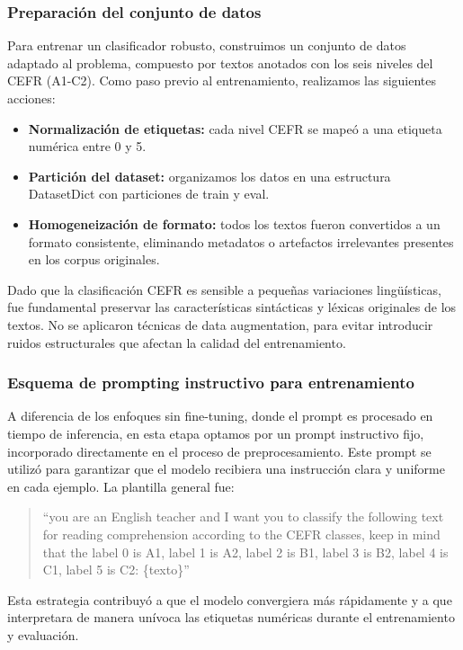 \subsubsection*{Preparación del conjunto de datos}
Para entrenar un clasificador robusto, construimos un conjunto de datos adaptado al problema, compuesto por textos anotados con los seis niveles del CEFR (A1-C2). Como paso previo al entrenamiento, realizamos las siguientes acciones:

\begin{itemize}
    \item \textbf{Normalización de etiquetas:} cada nivel CEFR se mapeó a una etiqueta numérica entre 0 y 5.
    \item \textbf{Partición del dataset:} organizamos los datos en una estructura DatasetDict con particiones de train y eval.
    \item \textbf{Homogeneización de formato:} todos los textos fueron convertidos a un formato consistente, eliminando metadatos o artefactos irrelevantes presentes en los corpus originales.
\end{itemize}

Dado que la clasificación CEFR es sensible a pequeñas variaciones lingüísticas, fue fundamental preservar las características sintácticas y léxicas originales de los textos. No se aplicaron técnicas de data augmentation, para evitar introducir ruidos estructurales que afectan la calidad del entrenamiento.

\subsubsection*{Esquema de prompting instructivo para entrenamiento}
A diferencia de los enfoques sin fine-tuning, donde el prompt es procesado en tiempo de inferencia, en esta etapa optamos por un prompt instructivo fijo, incorporado directamente en el proceso de preprocesamiento. Este prompt se utilizó para garantizar que el modelo recibiera una instrucción clara y uniforme en cada ejemplo. La plantilla general fue:

\begin{quote}
``you are an English teacher and I want you to classify the following text for reading comprehension according to the CEFR classes, keep in mind that the label 0 is A1, label 1 is A2, label 2 is B1, label 3 is B2, label 4 is C1, label 5 is C2:
\{texto\}''  
\end{quote}

Esta estrategia contribuyó a que el modelo convergiera más rápidamente y a que interpretara de manera unívoca las etiquetas numéricas durante el entrenamiento y evaluación.

